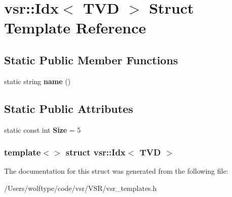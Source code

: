 \hypertarget{structvsr_1_1_idx_3_01_t_v_d_01_4}{\section{vsr\-:\-:Idx$<$ T\-V\-D $>$ Struct Template Reference}
\label{structvsr_1_1_idx_3_01_t_v_d_01_4}
}
\subsection*{Static Public Member Functions}
\begin{DoxyCompactItemize}
\item 
\hypertarget{structvsr_1_1_idx_3_01_t_v_d_01_4_a70d935ac9220149fdefae8aebf47b9d1}{static string {\bfseries name} ()}\label{structvsr_1_1_idx_3_01_t_v_d_01_4_a70d935ac9220149fdefae8aebf47b9d1}

\end{DoxyCompactItemize}
\subsection*{Static Public Attributes}
\begin{DoxyCompactItemize}
\item 
\hypertarget{structvsr_1_1_idx_3_01_t_v_d_01_4_a70858501b5e86ae0f54ffdedceb8a8f9}{static const int {\bfseries Size} = 5}\label{structvsr_1_1_idx_3_01_t_v_d_01_4_a70858501b5e86ae0f54ffdedceb8a8f9}

\end{DoxyCompactItemize}
\subsubsection*{template$<$$>$ struct vsr\-::\-Idx$<$ T\-V\-D $>$}



The documentation for this struct was generated from the following file\-:\begin{DoxyCompactItemize}
\item 
/\-Users/wolftype/code/vsr/\-V\-S\-R/vsr\-\_\-templates.\-h\end{DoxyCompactItemize}
